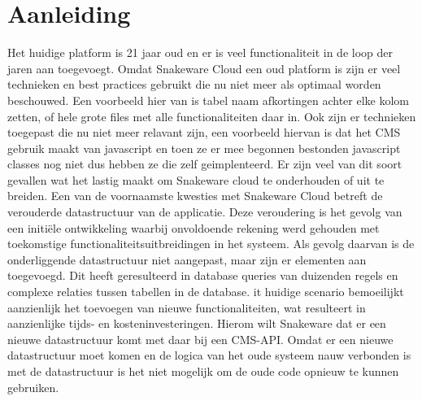 \section{Aanleiding} 
Het huidige platform is 21 jaar oud en er is veel functionaliteit in de loop der jaren aan toegevoegt.
Omdat Snakeware Cloud een oud platform is zijn er veel technieken en best practices gebruikt die nu niet meer als optimaal worden beschouwed.
Een voorbeeld hier van is tabel naam afkortingen achter elke kolom zetten, of hele grote files met alle functionaliteiten daar in. 
Ook zijn er technieken toegepast die nu niet meer relavant zijn, een voorbeeld hiervan is dat het CMS gebruik maakt van javascript en toen ze er mee begonnen bestonden javascript classes nog niet dus hebben ze die zelf geimplenteerd.
Er zijn veel van dit soort gevallen wat het lastig maakt om Snakeware cloud te onderhouden of uit te breiden.
\whitespace
Een van de voornaamste kwesties met Snakeware Cloud betreft de verouderde datastructuur van de applicatie.
Deze veroudering is het gevolg van een initiële ontwikkeling waarbij onvoldoende rekening werd gehouden met toekomstige functionaliteitsuitbreidingen in het systeem.
Als gevolg daarvan is de onderliggende datastructuur niet aangepast, maar zijn er elementen aan toegevoegd.
Dit heeft geresulteerd in database queries van duizenden regels en complexe relaties tussen tabellen in de database.
it huidige scenario bemoeilijkt aanzienlijk het toevoegen van nieuwe functionaliteiten, wat resulteert in aanzienlijke tijds- en kosteninvesteringen.
\whitespace
Hierom wilt Snakeware dat er een nieuwe datastructuur komt met daar bij een CMS-API.
Omdat er een nieuwe datastructuur moet komen en de logica van het oude systeem nauw verbonden is met de
datastructuur is het niet mogelijk om de oude code opnieuw te kunnen gebruiken.
